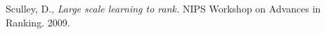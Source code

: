 \documentclass[11pt]{article}
\begin{document}
\begin{thebibliography}{100}

 Sculley, D., \emph{Large scale learning to rank.} 
NIPS Workshop on Advances in Ranking. 2009.

\end{thebibliography}
\end{document}
